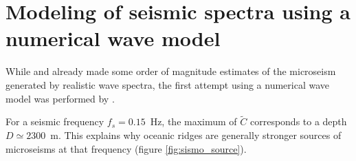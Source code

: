 \section{Modeling of seismic spectra using a numerical wave model}
While \cite{Hasselmann1963c} and \cite{Szelwis1982} already made some order of magnitude estimates of the microseism generated by 
realistic wave spectra, the first attempt using a numerical wave model was performed by \cite{Kedar&al.2008}. 

For a seismic frequency  $f_s=0.15$~Hz, the maximum of $\widetilde{C}$ corresponds to a depth $D\simeq2300$~m. This explains 
why oceanic ridges are generally stronger sources of microseisms at that frequency (figure \ref{fig:sismo_source}).

